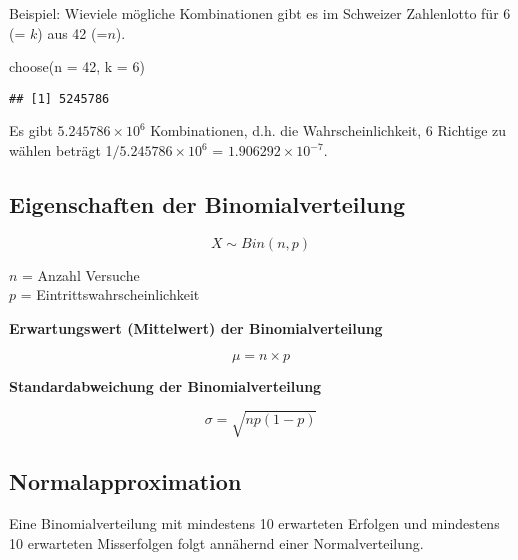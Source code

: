 \documentclass[
]{book}
\newenvironment{Shaded}{\begin{snugshade}}{\end{snugshade}}
\newcommand{\AttributeTok}[1]{\textcolor[rgb]{0.77,0.63,0.00}{#1}}
\newcommand{\DecValTok}[1]{\textcolor[rgb]{0.00,0.00,0.81}{#1}}
\newcommand{\FunctionTok}[1]{\textcolor[rgb]{0.00,0.00,0.00}{#1}}
\newcommand{\NormalTok}[1]{#1}
\begin{document}
Beispiel: Wieviele mögliche Kombinationen gibt es im Schweizer Zahlenlotto für 6 (= \(k\)) aus 42 (=\(n\)).

\begin{Shaded}
\begin{Highlighting}[]
\FunctionTok{choose}\NormalTok{(}\AttributeTok{n =} \DecValTok{42}\NormalTok{, }\AttributeTok{k =} \DecValTok{6}\NormalTok{)}
\end{Highlighting}
\end{Shaded}

\begin{verbatim}
## [1] 5245786
\end{verbatim}

Es gibt \(\ensuremath{5.245786\times 10^{6}}\) Kombinationen, d.h. die Wahrscheinlichkeit, 6 Richtige zu wählen beträgt 1\(/\ensuremath{5.245786\times 10^{6}}\) = \(\ensuremath{1.906292\times 10^{-7}}\).

\hypertarget{eigenschaften-der-binomialverteilung}{%
\subsection{Eigenschaften der Binomialverteilung}\label{eigenschaften-der-binomialverteilung}}

\begin{equation}
  X \sim Bin(n, p)
  \label{eq:binom2}
\end{equation}

\(n\) = Anzahl Versuche\\
\(p\) = Eintrittswahrscheinlichkeit

\textbf{Erwartungswert (Mittelwert) der Binomialverteilung}

\begin{equation}
  \mu = n \times p
  \label{eq:mubinom}
\end{equation}

\textbf{Standardabweichung der Binomialverteilung}

\begin{equation}
  \sigma = \sqrt{np(1-p)}
  \label{eq:sigmabinom}
\end{equation}

\hypertarget{normalapproximation}{%
\subsection{Normalapproximation}\label{normalapproximation}}

Eine Binomialverteilung mit mindestens 10 erwarteten Erfolgen und mindestens 10 erwarteten Misserfolgen folgt annähernd einer Normalverteilung.
\end{document}
